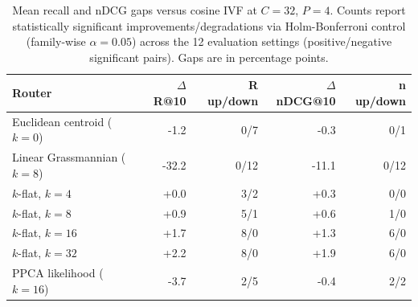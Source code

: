 \begin{table}[t]
\centering
\caption{Mean recall and nDCG gaps versus cosine IVF at $C{=}32$, $P{=}4$. Counts report statistically significant improvements/degradations via Holm-Bonferroni control (family-wise $\alpha = 0.05$) across the 12 evaluation settings (positive/negative significant pairs). Gaps are in percentage points.}
\label{tab:routers}
\footnotesize
\setlength{\tabcolsep}{3pt}
\begin{tabular}{lrrrr}
\toprule
Router & $\Delta$R@10 & R up/down & $\Delta$nDCG@10 & n up/down \\
\midrule
Euclidean centroid ($k{=}0$) & -1.2 & 0/7 & -0.3 & 0/1 \\
Linear Grassmannian ($k{=}8$) & -32.2 & 0/12 & -11.1 & 0/12 \\
$k$-flat, $k{=}4$ & +0.0 & 3/2 & +0.3 & 0/0 \\
$k$-flat, $k{=}8$ & +0.9 & 5/1 & +0.6 & 1/0 \\
$k$-flat, $k{=}16$ & +1.7 & 8/0 & +1.3 & 6/0 \\
$k$-flat, $k{=}32$ & +2.2 & 8/0 & +1.9 & 6/0 \\
PPCA likelihood ($k{=}16$) & -3.7 & 2/5 & -0.4 & 2/2 \\
\bottomrule
\end{tabular}
\end{table}
